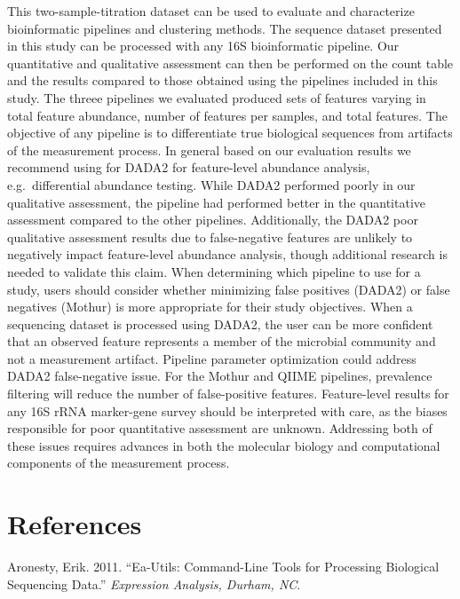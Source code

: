 \documentclass[smallextended]{svjour3}       %
\begin{document}
This two-sample-titration dataset can be used to evaluate and
characterize bioinformatic pipelines and clustering methods. The
sequence dataset presented in this study can be processed with any 16S
bioinformatic pipeline. Our quantitative and qualitative assessment can
then be performed on the count table and the results compared to those
obtained using the pipelines included in this study. The threee
pipelines we evaluated produced sets of features varying in total
feature abundance, number of features per samples, and total features.
The objective of any pipeline is to differentiate true biological
sequences from artifacts of the measurement process. In general based on
our evaluation results we recommend using for DADA2 for feature-level
abundance analysis, e.g.~differential abundance testing. While DADA2
performed poorly in our qualitative assessment, the pipeline had
performed better in the quantitative assessment compared to the other
pipelines. Additionally, the DADA2 poor qualitative assessment results
due to false-negative features are unlikely to negatively impact
feature-level abundance analysis, though additional research is needed
to validate this claim. When determining which pipeline to use for a
study, users should consider whether minimizing false positives (DADA2)
or false negatives (Mothur) is more appropriate for their study
objectives. When a sequencing dataset is processed using DADA2, the user
can be more confident that an observed feature represents a member of
the microbial community and not a measurement artifact. Pipeline
parameter optimization could address DADA2 false-negative issue. For the
Mothur and QIIME pipelines, prevalence filtering will reduce the number
of false-positive features. Feature-level results for any 16S rRNA
marker-gene survey should be interpreted with care, as the biases
responsible for poor quantitative assessment are unknown. Addressing
both of these issues requires advances in both the molecular biology and
computational components of the measurement process.

\hypertarget{references}{%
\section*{References}\label{references}}

\hypertarget{refs}{}
\leavevmode\hypertarget{ref-aronesty2011ea}{}%
Aronesty, Erik. 2011. ``Ea-Utils: Command-Line Tools for Processing
Biological Sequencing Data.'' \emph{Expression Analysis, Durham, NC}.
\end{document}
